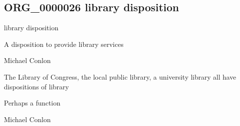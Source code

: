 \documentclass[letterpaper,10pt,english]{sphinxmanual}
\begin{document}
\subsection{ORG\_0000026 \sphinxhyphen{} library disposition}
\label{\detokenize{doc-ORG_0000026:org-0000026-library-disposition}}\label{\detokenize{doc-ORG_0000026:index-0}}\label{\detokenize{doc-ORG_0000026::doc}}
\begin{sphinxShadowBox}

\sphinxAtStartPar
library disposition
\end{sphinxShadowBox}

\begin{sphinxShadowBox}

\sphinxAtStartPar
{\hyperref[\detokenize{doc-BFO_0000016::doc}]{}}
\end{sphinxShadowBox}

\begin{sphinxShadowBox}

\sphinxAtStartPar
A disposition to provide library services
\end{sphinxShadowBox}

\begin{sphinxShadowBox}

\sphinxAtStartPar
Michael Conlon 
\end{sphinxShadowBox}

\begin{sphinxShadowBox}

\sphinxAtStartPar
The Library of Congress, the local public library, a university library all have dispositions of library
\end{sphinxShadowBox}

\begin{sphinxShadowBox}

\sphinxAtStartPar
Perhaps a function
\end{sphinxShadowBox}

\begin{sphinxShadowBox}

\sphinxAtStartPar
Michael Conlon 
\end{sphinxShadowBox}
\begin{quote}

\ignorespaces \end{quote}
\end{document}
